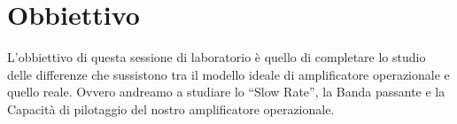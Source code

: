 \section*{Obbiettivo}

L'obbiettivo di questa sessione di laboratorio è quello di completare lo studio delle differenze che sussistono tra il modello ideale di amplificatore operazionale e quello reale.
Ovvero andreamo a studiare lo ``Slow Rate'', la Banda passante e la Capacità di pilotaggio del nostro amplificatore operazionale.
